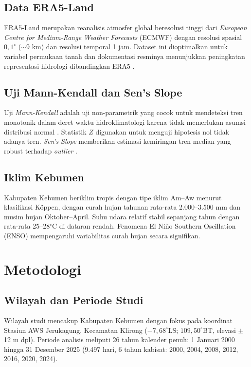 \documentclass[12pt, a4paper]{article}
\newcommand{\degC}{$^{\circ}$C}
\newcommand{\mk}{\textit{Mann-Kendall}}
\newcommand{\sens}{\textit{Sen's Slope}}
\begin{document}
\subsection{Data ERA5-Land}

ERA5-Land merupakan reanalisis atmosfer global beresolusi tinggi dari \textit{European Centre for Medium-Range Weather Forecasts} (ECMWF) dengan resolusi spasial $0{,}1^{\circ}$ ($\sim$9 km) dan resolusi temporal 1 jam. Dataset ini dioptimalkan untuk variabel permukaan tanah dan dokumentasi resminya menunjukkan peningkatan representasi hidrologi dibandingkan ERA5 \citep{munoz2021}.

\subsection{Uji Mann-Kendall dan Sen's Slope}

Uji \mk{} adalah uji non-parametrik yang cocok untuk mendeteksi tren monotonik dalam deret waktu hidroklimatologi karena tidak memerlukan asumsi distribusi normal \citep{mann1945,kendall1975}. Statistik $Z$ digunakan untuk menguji hipotesis nol tidak adanya tren. \sens{} memberikan estimasi kemiringan tren median yang robust terhadap \textit{outlier} \citep{sen1968}.

\subsection{Iklim Kebumen}

Kabupaten Kebumen beriklim tropis dengan tipe iklim Am--Aw menurut klasifikasi K\"{o}ppen, dengan curah hujan tahunan rata-rata 2.000--3.500 mm dan musim hujan Oktober--April. Suhu udara relatif stabil sepanjang tahun dengan rata-rata 25--28\degC{} di dataran rendah. Fenomena El Ni\~{n}o Southern Oscillation (ENSO) mempengaruhi variabilitas curah hujan secara signifikan.

\section{Metodologi}

\subsection{Wilayah dan Periode Studi}

Wilayah studi mencakup Kabupaten Kebumen dengan fokus pada koordinat Stasiun AWS Jerukagung, Kecamatan Klirong ($-7{,}68^{\circ}$LS; $109{,}50^{\circ}$BT, elevasi $\pm$12 m dpl). Periode analisis meliputi 26 tahun kalender penuh: 1 Januari 2000 hingga 31 Desember 2025 (9.497 hari, 6 tahun kabisat: 2000, 2004, 2008, 2012, 2016, 2020, 2024).
\end{document}
